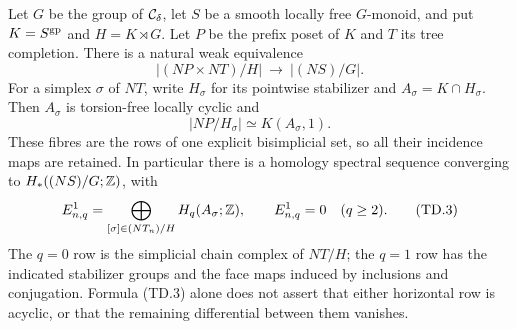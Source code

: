 \begin{proposition}
\label{G:treedoublemodel}
Let $G$ be the group of $\mathcal C_\delta$, let $S$ be a smooth locally
free $G$-monoid, and put $K=S^{\mathrm{gp}}$ and $H=K\rtimes G$.
Let $P$ be the prefix poset of $K$ and $T$ its tree completion.
There is a natural weak equivalence
\[
 \bigl|(NP\times NT)/H\bigr|\ \longrightarrow\ |(NS)/G|.
 \tag{TD.1}
\]
For a simplex $\sigma$ of $NT$, write $H_\sigma$ for its
pointwise stabilizer and $A_\sigma=K\cap H_\sigma$. Then
$A_\sigma$ is torsion-free locally cyclic and
\[
 |NP/H_\sigma|\simeq K(A_\sigma,1).
 \tag{TD.2}
\]
These fibres are the rows of one explicit bisimplicial set,
so all their incidence maps are retained. In particular there
is a homology spectral sequence converging to
$H_*((NS)/G;\mathbb Z)$, with
\[
 E^1_{n,q}=\bigoplus_{[\sigma]\in (NT_n)/H}
                H_q(A_\sigma;\mathbb Z),\qquad
 E^1_{n,q}=0\quad(q\geq2).
 \tag{TD.3}
\]
The $q=0$ row is the simplicial chain complex of $NT/H$; the
$q=1$ row has the indicated stabilizer groups and the face maps
induced by inclusions and conjugation. Formula (TD.3) alone does
not assert that either horizontal row is acyclic, or that the
remaining differential between them vanishes.
\end{proposition}

